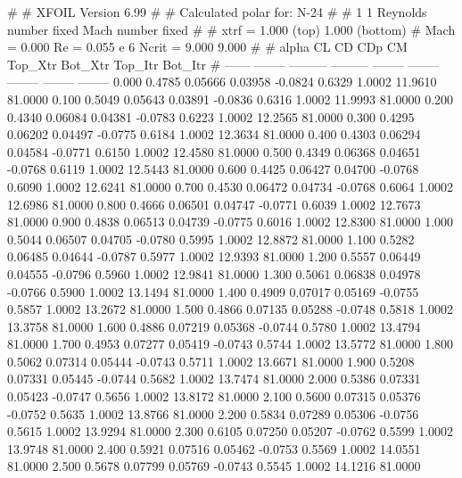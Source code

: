 #  
#       XFOIL         Version 6.99
#  
# Calculated polar for: N-24                                            
#  
# 1 1 Reynolds number fixed          Mach number fixed         
#  
# xtrf =   1.000 (top)        1.000 (bottom)  
# Mach =   0.000     Re =     0.055 e 6     Ncrit =   9.000  9.000
#  
#   alpha    CL        CD       CDp       CM     Top_Xtr  Bot_Xtr  Top_Itr  Bot_Itr
#  ------ -------- --------- --------- -------- -------- -------- -------- --------
   0.000   0.4785   0.05666   0.03958  -0.0824   0.6329   1.0002  11.9610  81.0000
   0.100   0.5049   0.05643   0.03891  -0.0836   0.6316   1.0002  11.9993  81.0000
   0.200   0.4340   0.06084   0.04381  -0.0783   0.6223   1.0002  12.2565  81.0000
   0.300   0.4295   0.06202   0.04497  -0.0775   0.6184   1.0002  12.3634  81.0000
   0.400   0.4303   0.06294   0.04584  -0.0771   0.6150   1.0002  12.4580  81.0000
   0.500   0.4349   0.06368   0.04651  -0.0768   0.6119   1.0002  12.5443  81.0000
   0.600   0.4425   0.06427   0.04700  -0.0768   0.6090   1.0002  12.6241  81.0000
   0.700   0.4530   0.06472   0.04734  -0.0768   0.6064   1.0002  12.6986  81.0000
   0.800   0.4666   0.06501   0.04747  -0.0771   0.6039   1.0002  12.7673  81.0000
   0.900   0.4838   0.06513   0.04739  -0.0775   0.6016   1.0002  12.8300  81.0000
   1.000   0.5044   0.06507   0.04705  -0.0780   0.5995   1.0002  12.8872  81.0000
   1.100   0.5282   0.06485   0.04644  -0.0787   0.5977   1.0002  12.9393  81.0000
   1.200   0.5557   0.06449   0.04555  -0.0796   0.5960   1.0002  12.9841  81.0000
   1.300   0.5061   0.06838   0.04978  -0.0766   0.5900   1.0002  13.1494  81.0000
   1.400   0.4909   0.07017   0.05169  -0.0755   0.5857   1.0002  13.2672  81.0000
   1.500   0.4866   0.07135   0.05288  -0.0748   0.5818   1.0002  13.3758  81.0000
   1.600   0.4886   0.07219   0.05368  -0.0744   0.5780   1.0002  13.4794  81.0000
   1.700   0.4953   0.07277   0.05419  -0.0743   0.5744   1.0002  13.5772  81.0000
   1.800   0.5062   0.07314   0.05444  -0.0743   0.5711   1.0002  13.6671  81.0000
   1.900   0.5208   0.07331   0.05445  -0.0744   0.5682   1.0002  13.7474  81.0000
   2.000   0.5386   0.07331   0.05423  -0.0747   0.5656   1.0002  13.8172  81.0000
   2.100   0.5600   0.07315   0.05376  -0.0752   0.5635   1.0002  13.8766  81.0000
   2.200   0.5834   0.07289   0.05306  -0.0756   0.5615   1.0002  13.9294  81.0000
   2.300   0.6105   0.07250   0.05207  -0.0762   0.5599   1.0002  13.9748  81.0000
   2.400   0.5921   0.07516   0.05462  -0.0753   0.5569   1.0002  14.0551  81.0000
   2.500   0.5678   0.07799   0.05769  -0.0743   0.5545   1.0002  14.1216  81.0000
